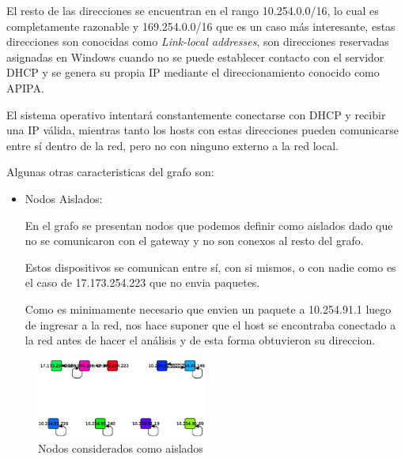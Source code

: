 \par El resto de las direcciones se encuentran en el rango 10.254.0.0/16, lo cual es completamente razonable y 169.254.0.0/16 que es un caso más interesante, estas direcciones son conocidas como \emph{Link-local addresses}, son direcciones reservadas asignadas en Windows cuando no se puede establecer contacto con el servidor DHCP y se genera su propia IP mediante el direccionamiento conocido como APIPA\cite{apipa}.

	\par El sistema operativo intentará constantemente conectarse con DHCP y recibir una IP válida, mientras tanto los hosts con estas direcciones pueden comunicarse entre sí dentro de la red, pero no con ninguno externo a la red local.
\vspace{6 mm}
	\par Algunas otras caracteristicas del grafo son:

\begin{itemize}

\item Nodos Aislados:

\par En el grafo se presentan nodos que podemos definir como aislados dado que no se comunicaron con el gateway y no son conexos  al resto del grafo.
    
\par Estos dispositivos se comunican entre sí, con si mismos, o con nadie como es el caso de 17.173.254.223 que no envia paquetes.

\par  Como es minimamente necesario que envien un paquete a 10.254.91.1 luego de ingresar a la red, nos hace suponer que el host se encontraba conectado a la red antes de hacer el análisis y de esta forma obtuvieron su direccion.  
\end{itemize}

\begin{figure}[!htb]
		\centering
		\includegraphics[width=0.5\textwidth]{img/graph/escenario_3/nodos_aislados.eps}
		\caption{Nodos considerados como aislados}
		\label{fig:aislados_escenario3}
\end{figure}


